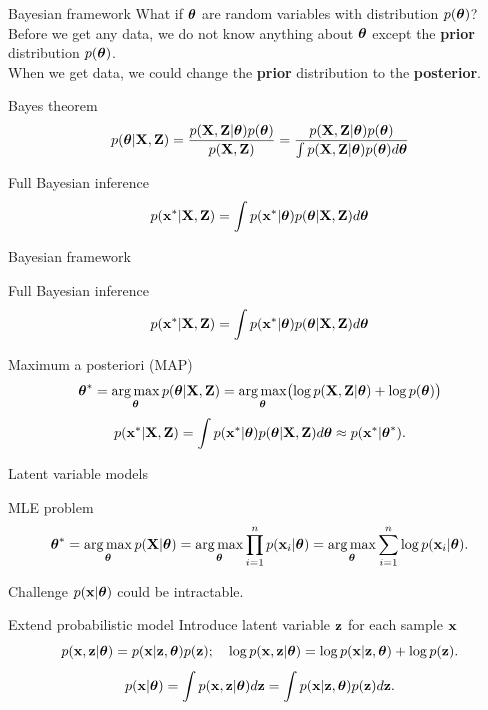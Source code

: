 \begin{frame}{Bayesian framework}
    What if $\boldsymbol{\theta}$ are random variables with distribution $p(\boldsymbol{\theta})$? \\
    Before we get any data, we do not know anything about $\boldsymbol{\theta}$ except the \textbf{prior}  distribution $p(\boldsymbol{\theta})$. \\
    When we get data, we could change the \textbf{prior} distribution to the \textbf{posterior}. 
    \begin{block}{Bayes theorem}
    \[
        p(\boldsymbol{\theta} | \mathbf{X}, \mathbf{Z}) = \frac{p(\mathbf{X}, \mathbf{Z} | \boldsymbol{\theta}) p(\boldsymbol{\theta})}{p(\mathbf{X}, \mathbf{Z})} = \frac{p(\mathbf{X}, \mathbf{Z} | \boldsymbol{\theta}) p(\boldsymbol{\theta})}{\int p(\mathbf{X} , \mathbf{Z} | \boldsymbol{\theta}) p(\boldsymbol{\theta}) d \boldsymbol{\theta}} 
    \]
    \end{block}
    \begin{block}{Full Bayesian inference}
    \[
        p(\mathbf{x}^* | \mathbf{X}, \mathbf{Z}) = \int p(\mathbf{x}^* | \boldsymbol{\theta}) p(\boldsymbol{\theta} | \mathbf{X}, \mathbf{Z}) d \boldsymbol{\theta}
    \]
    \end{block}
\end{frame}
\begin{frame}{Bayesian framework}
    \begin{block}{Full Bayesian inference}
    \[
        p(\mathbf{x}^* | \mathbf{X}, \mathbf{Z}) = \int p(\mathbf{x}^* | \boldsymbol{\theta}) p(\boldsymbol{\theta} | \mathbf{X}, \mathbf{Z}) d \boldsymbol{\theta}
    \]
    \end{block}
    \begin{block}{Maximum a posteriori (MAP)}
    \vspace{-0.2cm}
    \[
        \boldsymbol{\theta}^* = \operatorname*{arg\,max}_{\boldsymbol{\theta}} p(\boldsymbol{\theta} | \mathbf{X}, \mathbf{Z}) = \operatorname*{arg\,max}_{\boldsymbol{\theta}} \bigl(\log p(\mathbf{X}, \mathbf{Z} | \boldsymbol{\theta}) + \log p(\boldsymbol{\theta}) \bigr)
    \]
    \vspace{-0.2cm}
    \[
    p(\mathbf{x}^* | \mathbf{X}, \mathbf{Z}) = \int p(\mathbf{x}^* | \boldsymbol{\theta}) p(\boldsymbol{\theta} | \mathbf{X}, \mathbf{Z}) d \boldsymbol{\theta} \approx p(\mathbf{x}^* | \boldsymbol{\theta}^*).
    \]
    \end{block}
\end{frame}
\begin{frame}{Latent variable models}
    \begin{block}{MLE problem}
    \vspace{-0.3cm}
    \[
        \boldsymbol{\theta}^* = \operatorname*{arg\,max}_{\boldsymbol{\theta}} p(\mathbf{X} | \boldsymbol{\theta}) = \operatorname*{arg\,max}_{\boldsymbol{\theta}} \prod_{i=1}^n p(\mathbf{x}_i | \boldsymbol{\theta}) = \operatorname*{arg\,max}_{\boldsymbol{\theta}} \sum_{i=1}^n \log p(\mathbf{x}_i | \boldsymbol{\theta}).
    \]
    \vspace{-0.3cm}
    \end{block}
    \begin{block}{Challenge}
    $p(\mathbf{x} | \boldsymbol{\theta})$ could be intractable.
    \end{block}
    \begin{block}{Extend probabilistic model}
    Introduce latent variable $\mathbf{z}$ for each sample $\mathbf{x}$
    \[
        p(\mathbf{x}, \mathbf{z} | \boldsymbol{\theta}) = p(\mathbf{x} | \mathbf{z}, \boldsymbol{\theta}) p(\mathbf{z}); \quad 
        \log p(\mathbf{x}, \mathbf{z} | \boldsymbol{\theta}) = \log p(\mathbf{x} | \mathbf{z}, \boldsymbol{\theta}) + \log p(\mathbf{z}).
    \]
    \[
        p(\mathbf{x} | \boldsymbol{\theta}) = \int p(\mathbf{x}, \mathbf{z} | \boldsymbol{\theta}) d\mathbf{z} = \int p(\mathbf{x} | \mathbf{z}, \boldsymbol{\theta}) p(\mathbf{z}) d\mathbf{z}.
    \]
    \end{block}
\end{frame}
